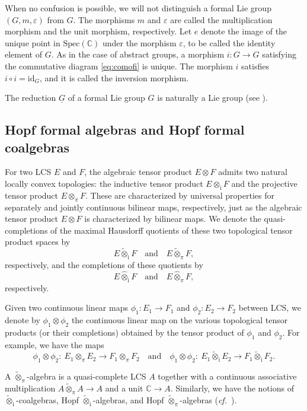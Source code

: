 \documentclass[12pt, a4paper]{amsart}
\newcommand{\BC}{{\mathbb {C}}}
\newcommand{\Ri}{{\mathrm{i}}}
\newcommand{\Spec}{{\mathrm{Spec}}}
\newcommand{\wt}{\widetilde}
\newcommand{\C}{\mathbb{C}}
\newcommand{\qaq}{\quad\textrm{and}\quad}
\newcommand{\cf}{\textit{cf.}~}
\theoremstyle{Theorem}
\theoremstyle{Theorem}
\theoremstyle{Theorem}
\theoremstyle{Theorem}
\theoremstyle{Plain}
\theoremstyle{remark}
\theoremstyle{remark}
\theoremstyle{Definition}
\numberwithin{equation}{section}
\begin{document}
When no confusion is possible, we will not distinguish a formal Lie group $(G, m, \varepsilon)$ from $G$. The morphisms $m$ and $\varepsilon$ are called the multiplication morphism and the unit morphism, respectively. Let $e$ denote the image of the unique point in $\Spec (\BC)$ under the morphism $\varepsilon$, to be called the identity element of $G$.
As in the case of abstract groups, a morphism $i: G\rightarrow G$ satisfying the commutative diagram \eqref{eq:comofi} is unique. The morphism $i$ satisfies $i\circ i=\mathrm{id}_G$, and it is called the inversion morphism. 


The reduction $\underline{G}$ of a formal Lie group $G$ is naturally a Lie group (see \cite[Example 3.5]{CSW4}).
\subsection{Hopf formal algebras and Hopf  formal coalgebras}\label{sec:comodofHopf}
For two LCS $E$ and $F$, the algebraic tensor product $E \otimes F$ admits two natural locally convex topologies: the inductive tensor product $E \otimes_{\mathrm{i}} F$ and the projective tensor product $E \otimes_{\pi} F$. These are characterized by universal properties for separately and jointly continuous bilinear maps, respectively, just as the algebraic tensor product $E \otimes F$ is characterized by bilinear maps. We denote the quasi-completions of the maximal Hausdorff quotients of these two topological tensor product spaces by
\[
E\wt\otimes_{\mathrm{i}}F
\quad\text{and}\quad
E\wt\otimes_{\pi}F,\]
respectively, and the completions of these quotients by
\[
E\widehat\otimes_{\mathrm{i}}F
\quad\text{and}\quad
E\widehat\otimes_{\pi}F,
\]
respectively.

Given two continuous linear maps $\phi_1:E_1\to F_1$ and $\phi_2:E_2\to F_2$ between LCS, we denote by $\phi_1\otimes\phi_2$ the continuous linear map on the various topological tensor products (or their completions) obtained by the tensor product of $\phi_1$ and $\phi_2$. For example, we have the maps
\[
\phi_1\otimes\phi_2:\ E_1\otimes_\pi E_2 \longrightarrow F_1\otimes_\pi F_2 \qaq
\phi_1\otimes\phi_2:\ E_1\wt{\otimes}_\Ri E_2 \longrightarrow F_1\wt{\otimes}_\Ri F_2.
\]



A {$\wt{\otimes}_{\pi}$-algebra}  is a quasi-complete  LCS $A$ together with a continuous associative multiplication $A \wt{\otimes}_{\pi} A \rightarrow A$  and a unit $\mathbb{C} \rightarrow A$. Similarly, we have the notions of  $\wt{\otimes}_{\mathrm{i}}$-coalgebras,  Hopf $\wt{\otimes}_{\mathrm{i}}$-algebras, and Hopf  $\wt{\otimes}_{\pi}$-algebras (\cf \cite[Appendix A.2]{CSW4}).  
\end{document}
